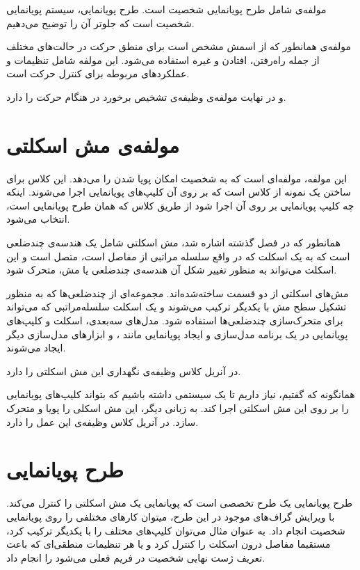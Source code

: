 مولفه‌ی 
شامل طرح پویانمایی شخصیت است. طرح پویانمایی، سیستم پویانمایی شخصیت است که جلوتر آن را توضیح می‌دهیم.


مولفه‌ی 
همانطور که از اسمش مشخص است برای منطق حرکت در حالت‌های مختلف از جمله راه‌رفتن، افتادن و غیره استفاده می‌شود.
این مولفه شامل تنظیمات و عملکرد‌های مربوطه برای کنترل حرکت است.

و در نهایت مولفه‌‌ی
وظیفه‌ی تشخیص برخورد در هنگام حرکت را دارد.


\section{مولفه‌ی مش اسکلتی}

این مولفه‌، مولفه‌ای است که به شخصیت امکان پویا شدن را می‌دهد.
این کلاس برای ساختن یک نمونه از کلاس 
است که بر روی آن کلیپ‌های پویانمایی اجرا می‌شوند.
اینکه چه کلیپ پویانمایی بر روی آن اجرا شود از طریق کلاس 
که همان طرح پویانمایی
 است، انتخاب می‌شود.

همانطور که در فصل گذشته اشاره شد، مش اسکلتی 
شامل یک هندسه‌ی چندضلعی است که به یک اسکلت که در واقع 
سلسله مراتبی از مفاصل است، متصل است و این اسکلت می‌تواند به 
منظور تغییر شکل آن هندسه‌ی چندضلعی یا مش، متحرک شود.

مش‌های اسکلتی از دو قسمت ساخته‌شده‌اند. مجموعه‌ای از چندضلعی‌ها
که به منظور تشکیل سطح مش با یکدیگر ترکیب می‌شوند و 
یک اسکلت سلسله‌مراتبی که می‌تواند برای متحرک‌سازی چند‌ضلعی‌ها استفاده شود.
مدل‌های سه‌بعدی، 
اسکلت
و کلیپ‌های پویانمایی 
در یک برنامه مدل‌سازی و ایجاد پویانمایی
مانند 
،
و ابزار‌های مدل‌سازی دیگر ایجاد می‌شوند.

در آنریل کلاس 
وظیفه‌ی نگهداری این مش اسکلتی را دارد.

همانگونه که گفتیم، نیاز داریم تا یک سیستمی داشته باشیم 
که بتواند کلیپ‌های پویانمایی را بر روی 
این مش اسکلتی اجرا کند. به زبانی دیگر، این 
مش اسکلی را پویا و متحرک سازد.
در آنریل کلاس 
وظیفه‌ی این عمل را دارد.

\section{طرح پویانمایی}

طرح پویانمایی یک طرح تخصصی است که پویانمایی 
یک مش اسکلتی را کنترل می‌کند.
با ویرایش گراف‌های موجود در این طرح، 
میتوان کار‌های مختلفی را روی پویانمایی شخصیت انجام داد.
به عنوان مثال می‌توان کلیپ‌های مختلف را با یکدیگر ترکیب کرد،
مستقیما مفاصل درون اسکلت را کنترل کرد و
یا هر تنظیمات منطقی‌ای که باعث تعریف 
ژست نهایی شخصیت در فریم فعلی می‌شود را انجام داد.

